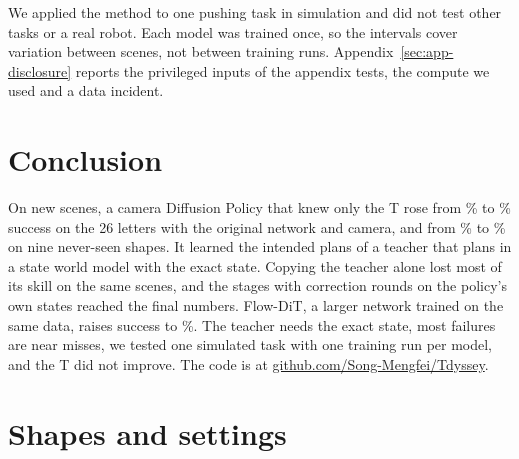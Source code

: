 \documentclass[10pt,twocolumn,letterpaper]{article}
\begin{document}
We applied the method to one pushing task in simulation and did not test other tasks or a real robot. Each model was
trained once, so the intervals cover variation between scenes, not between training runs.
Appendix~\ref{sec:app-disclosure} reports the privileged inputs of the appendix tests, the compute we used and a data
incident.

\section{Conclusion}
\label{sec:conclusion}

On new scenes, a camera Diffusion Policy that knew only the T rose from \numHeadOrig\% to \numHeadMain\% success on
the 26 letters with the original network and camera, and from \numUnseenOrig\% to \numUnseenMain\% on nine never-seen
shapes. It learned the intended plans of a teacher that plans in a state world model with the exact state. Copying the
teacher alone lost most of its skill on the same scenes, and the stages with correction rounds on the policy's own
states reached the final numbers. Flow-DiT, a larger network trained on the same data, raises success to
\numHeadFlow\%. The teacher needs the exact state, most failures are near misses, we tested one simulated task with
one training run per model, and the T did not improve. The code is at \href{https://github.com/Song-Mengfei/Tdyssey}{github.com/Song-Mengfei/Tdyssey}.


\renewcommand{\bibfont}{\small}
\setlength{\bibsep}{2pt plus 1pt}

\appendix
\onecolumn

\section{Shapes and settings}
\label{sec:app-settings}
\end{document}
